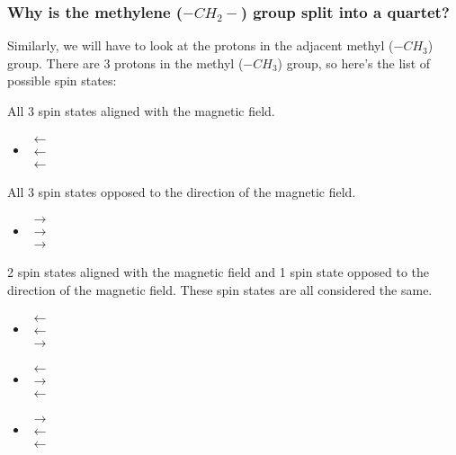 \documentclass[11pt]{article}
\begin{document}
\newpage
\subsubsection{Why is the methylene (\(-CH_2-\)) group split into a quartet?}
\label{sec:orgffd7691}
Similarly, we will have to look at the protons in the adjacent methyl (\(-CH_3\)) group. There are 3 protons in the methyl (\(-CH_3\)) group, so here's the list of possible spin states:


All 3 spin states aligned with the magnetic field.
\begin{itemize}
\item \(\mathrel{\substack{\textstyle\leftarrow \\[-0.6ex] \textstyle\leftarrow \\[-0.6ex] \textstyle\leftarrow}}\)
\end{itemize}

All 3 spin states opposed to the direction of the magnetic field.
\begin{itemize}
\item \(\mathrel{\substack{\textstyle\rightarrow \\[-0.6ex] \textstyle\rightarrow \\[-0.6ex] \textstyle\rightarrow}}\)
\end{itemize}

2 spin states aligned with the magnetic field and 1 spin state opposed to the direction of the magnetic field. These spin states are all considered the same.
\begin{itemize}
\item \(\mathrel{\substack{\textstyle\leftarrow \\[-0.6ex] \textstyle\leftarrow \\[-0.6ex] \textstyle\rightarrow}}\)
\item \(\mathrel{\substack{\textstyle\leftarrow \\[-0.6ex] \textstyle\rightarrow \\[-0.6ex] \textstyle\leftarrow}}\)
\item \(\mathrel{\substack{\textstyle\rightarrow \\[-0.6ex] \textstyle\leftarrow \\[-0.6ex] \textstyle\leftarrow}}\)
\end{itemize}
\end{document}
